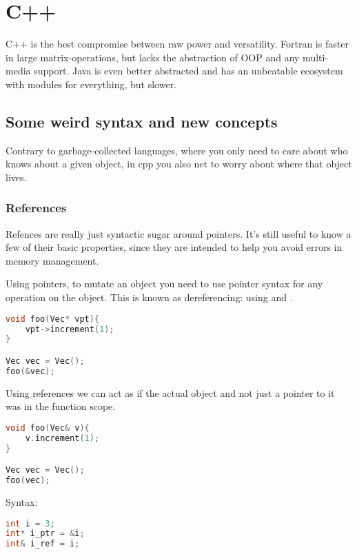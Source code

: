 \section{C++}

C++ is the best compromise between raw power and versatility. Fortran is faster in large matrix-operations, but lacks the abstraction of OOP and any multi-media support. Java is even better abstracted and has an unbeatable ecosystem with modules for everything, but slower. 



\subsection{Some weird syntax and new concepts}
Contrary to garbage-collected languages, where you only need to care about who knows about a given object, in cpp you also net to worry about where that object lives. 

\subsubsection{References}
Refences are really just syntactic sugar around pointers. It's still useful to know a few of their basic properties, since they are intended to help you avoid errors in memory management. 

Using pointers, to mutate an object you need to use pointer syntax for any operation on the object. This is known as dereferencing: using  and .
\begin{lstlisting}[language=c++]
void foo(Vec* vpt){
    vpt->increment(1);
}

Vec vec = Vec();
foo(&vec);
\end{lstlisting}

Using references we can act as if the actual object and not just a pointer to it was in the function scope.
\begin{lstlisting}[language=c++]
void foo(Vec& v){
    v.increment(1);
}

Vec vec = Vec();
foo(vec);
\end{lstlisting}

Syntax: 
\begin{lstlisting}[language=c++]
int i = 3;
int* i_ptr = &i;
int& i_ref = i;
\end{lstlisting}

